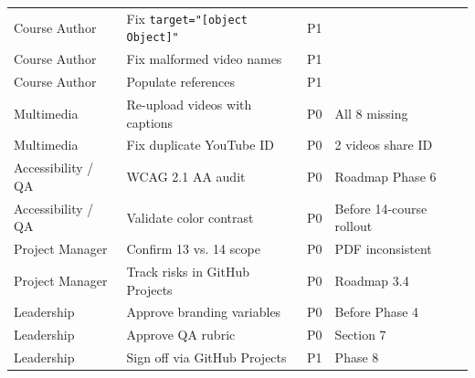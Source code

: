 \begin{longtable}{@{}p{}p{}p{}p{}@{}}
Course Author & Fix \texttt{target="[object Object]"} & P1 & \\
Course Author & Fix malformed video names & P1 & \\
Course Author & Populate references & P1 & \\
Multimedia & Re-upload videos with captions & P0 & All 8 missing \\
Multimedia & Fix duplicate YouTube ID & P0 & 2 videos share ID \\
Accessibility / QA & WCAG 2.1 AA audit & P0 & Roadmap Phase 6 \\
Accessibility / QA & Validate color contrast & P0 & Before 14-course rollout \\
Project Manager & Confirm 13 vs. 14 scope & P0 & PDF inconsistent \\
Project Manager & Track risks in GitHub Projects & P0 & Roadmap 3.4 \\
Leadership & Approve branding variables & P0 & Before Phase 4 \\
Leadership & Approve QA rubric & P0 & Section 7 \\
Leadership & Sign off via GitHub Projects & P1 & Phase 8 \\
\bottomrule
\end{longtable}